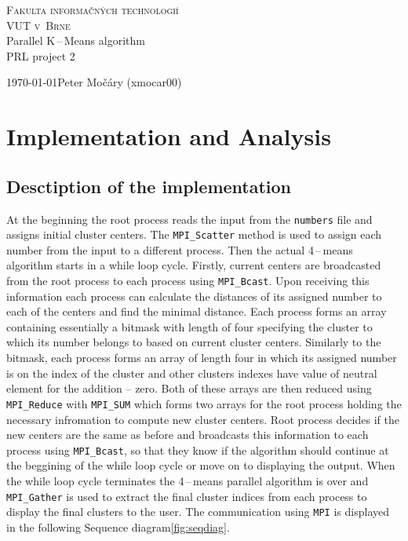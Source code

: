 \documentclass[a4paper, 11pt]{article}
\begin{document}
	\begin{titlepage}
		\renewcommand{\baselinestretch}{0.5}
		\thispagestyle{empty}
		\begin{center}
			\Huge
			\textsc{Fakulta informačných technologií\\[5pt]VUT v~Brne}\\
			\huge Parallel K\,--\,Means algorithm\\
			\Large PRL project 2
		\end{center}
		{
			\Large \today \hfill Peter Močáry (xmocar00)
		}
	\end{titlepage}

\newpage
\tableofcontents
\newpage
\setcounter{page}{1}


\section{Implementation and Analysis}
	\subsection{Desctiption of the implementation}
		At the beginning the root process reads the input from the
		\verb|numbers| file and assigns initial cluster centers. The
		\verb|MPI_Scatter| method is used to assign each number from the input
		to a different process. Then the actual 4\,--\,means algorithm starts
		in a while loop cycle. Firstly, current centers are broadcasted from
		the root process to each process using \verb|MPI_Bcast|. Upon
		receiving this information each process can calculate the distances of
		its assigned number to each of the centers and find the minimal
		distance. Each process forms an array containing essentially a bitmask
		with length of four specifying the cluster to which its number belongs
		to based on current cluster centers. Similarly to the bitmask, each
		process forms an array of length four in which its assigned number is
		on the index of the cluster and other clusters indexes have value of
		neutral element for the addition -- zero. Both of these arrays are
		then reduced using \verb|MPI_Reduce| with \verb|MPI_SUM| which forms
		two arrays for the root process holding the necessary infromation to
		compute new cluster centers. Root process decides if the new centers
		are the same as before and broadcasts this information to each process
		using \verb|MPI_Bcast|, so that they know if the algorithm should
		continue at the beggining of the while loop cycle or move on to
		displaying the output. When the while loop cycle terminates the
		4\,--\,means parallel algorithm is over and \verb|MPI_Gather| is used
		to extract the final cluster indices from each process to display the
		final clusters to the user. The communication using \verb|MPI| is
		displayed in the following Sequence diagram\;\ref{fig:seqdiag}.
\end{document}
